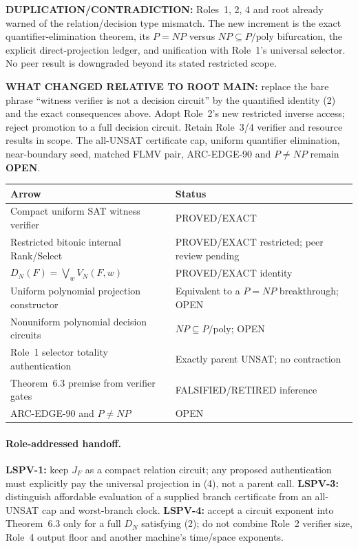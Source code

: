 \documentclass[11pt]{article}
\newcommand{\OPEN}{\textbf{OPEN}}
\begin{document}
\textbf{DUPLICATION/CONTRADICTION:} Roles~1, 2, 4 and root already warned of
the relation/decision type mismatch.  The new increment is the exact
quantifier-elimination theorem, its $P=NP$ versus $NP\subseteq
P/\mathrm{poly}$ bifurcation, the explicit direct-projection ledger, and
unification with Role~1's universal selector.  No peer result is downgraded
beyond its stated restricted scope.

\textbf{WHAT CHANGED RELATIVE TO ROOT MAIN:} replace the bare phrase
``witness verifier is not a decision circuit'' by the quantified identity
(2) and the exact consequences above.  Adopt Role~2's new restricted inverse
access; reject promotion to a full decision circuit.  Retain Role~3/4
verifier and resource results in scope.  The all-UNSAT certificate cap,
uniform quantifier elimination, near-boundary seed, matched FLMV pair,
ARC-EDGE-90 and $P\ne NP$ remain \OPEN.

\begin{center}
\begin{tabular}{p{.58\linewidth}p{.30\linewidth}}
\toprule
Arrow & Status\\\midrule
Compact uniform SAT witness verifier & PROVED/EXACT\\
Restricted bitonic internal Rank/Select & PROVED/EXACT restricted; peer review pending\\
$D_N(F)=\bigvee_wV_N(F,w)$ & PROVED/EXACT identity\\
Uniform polynomial projection constructor & Equivalent to a $P=NP$ breakthrough; OPEN\\
Nonuniform polynomial decision circuits & $NP\subseteq P/\mathrm{poly}$; OPEN\\
Role~1 selector totality authentication & Exactly parent UNSAT; no contraction\\
Theorem~6.3 premise from verifier gates & FALSIFIED/RETIRED inference\\
ARC-EDGE-90 and $P\ne NP$ & OPEN\\
\bottomrule
\end{tabular}
\end{center}

\paragraph{Role-addressed handoff.}
\textbf{LSPV-1:} keep $J_F$ as a compact relation circuit; any proposed
authentication must explicitly pay the universal projection in (4), not a
parent call.  \textbf{LSPV-3:} distinguish affordable evaluation of a
supplied branch certificate from an all-UNSAT cap and worst-branch clock.
\textbf{LSPV-4:} accept a circuit exponent into Theorem~6.3 only for a full
$D_N$ satisfying (2); do not combine Role~2 verifier size, Role~4 output
floor and another machine's time/space exponents.
\end{document}
